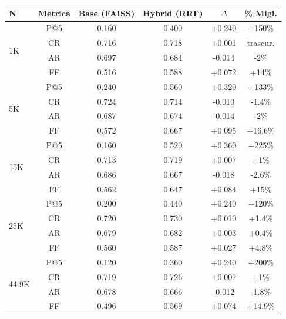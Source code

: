 \documentclass[12pt,a4paper]{article}
\begin{document}
\begin{resultbox}
\begin{center}
\begin{tabular}{lccccc}
\toprule
\textbf{N} & \textbf{Metrica} & \textbf{Base (FAISS)} & \textbf{Hybrid (RRF)} & $\Delta$ & \textbf{\% Migl.}\\
\midrule
\multirow{4}{*}{1K}   & P@5   & 0.160 & 0.400 & +0.240 & +150\% \\
                       & CR    & 0.716 & 0.718 & +0.001 & trascur. \\
                       & AR    & 0.697 & 0.684 & -0.014 & -2\% \\
                       & FF    & 0.516 & 0.588 & +0.072 & +14\% \\
\midrule
\multirow{4}{*}{5K}   & P@5   & 0.240 & 0.560 & +0.320 & +133\% \\
                       & CR    & 0.724 & 0.714 & -0.010 & -1.4\% \\
                       & AR    & 0.687 & 0.674 & -0.014 & -2\% \\
                       & FF    & 0.572 & 0.667 & +0.095 & +16.6\% \\
\midrule
\multirow{4}{*}{15K}  & P@5   & 0.160 & 0.520 & +0.360 & +225\% \\
                       & CR    & 0.713 & 0.719 & +0.007 & +1\% \\
                       & AR    & 0.686 & 0.667 & -0.018 & -2.6\% \\
                       & FF    & 0.562 & 0.647 & +0.084 & +15\% \\
\midrule
\multirow{4}{*}{25K}  & P@5   & 0.200 & 0.440 & +0.240 & +120\% \\
                       & CR    & 0.720 & 0.730 & +0.010 & +1.4\% \\
                       & AR    & 0.679 & 0.682 & +0.003 & +0.4\% \\
                       & FF    & 0.560 & 0.587 & +0.027 & +4.8\% \\
\midrule
\multirow{4}{*}{44.9K} & P@5  & 0.120 & 0.360 & +0.240 & +200\% \\
                        & CR   & 0.719 & 0.726 & +0.007 & +1\% \\
                        & AR   & 0.678 & 0.666 & -0.012 & -1.8\% \\
                        & FF   & 0.496 & 0.569 & +0.074 & +14.9\% \\
\bottomrule
\end{tabular}
\end{center}
\end{resultbox}
\end{document}

